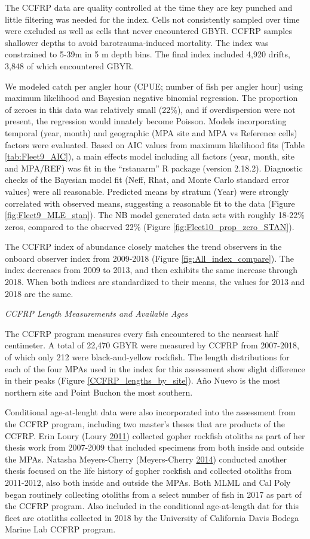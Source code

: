 \documentclass[12pt,]{article}
\begin{document}
The CCFRP data are quality controlled at the time they are key punched
and little filtering was needed for the index. Cells not consistently
sampled over time were excluded as well as cells that never encountered
GBYR. CCFRP samples shallower depths to avoid barotrauma-induced
mortality. The index was constrained to 5-39m in 5 m depth bins. The
final index included 4,920 drifts, 3,848 of which encountered GBYR.

We modeled catch per angler hour (CPUE; number of fish per angler hour)
using maximum likelihood and Bayesian negative binomial regression. The
proportion of zeroes in this data was relatively small (22\%), and if
overdispersion were not present, the regression would innately become
Poisson. Models incorporating temporal (year, month) and geographic (MPA
site and MPA vs Reference cells) factors were evaluated. Based on AIC
values from maximum likelihood fits (Table \ref{tab:Fleet9_AIC}), a main
effects model including all factors (year, month, site and MPA/REF) was
fit in the ``rstanarm'' R package (version 2.18.2). Diagnostic checks of
the Bayesian model fit (Neff, Rhat, and Monte Carlo standard error
values) were all reasonable. Predicted means by stratum (Year) were
strongly correlated with observed means, suggesting a reasonable fit to
the data (Figure \ref{fig:Fleet9_MLE_stan}). The NB model generated data
sets with roughly 18-22\% zeros, compared to the observed 22\% (Figure
\ref{fig:Fleet10_prop_zero_STAN}).

The CCFRP index of abundance closely matches the trend observers in the
onboard observer index from 2009-2018 (Figure
\ref{fig:All_index_compare}). The index decreases from 2009 to 2013, and
then exhibits the same increase through 2018. When both indices are
standardized to their means, the values for 2013 and 2018 are the same.

\emph{CCFRP Length Measurements and Available Ages}

The CCFRP program measures every fish encountered to the nearsest half
centimeter. A total of 22,470 GBYR were measured by CCFRP from
2007-2018, of which only 212 were black-and-yellow rockfish. The length
distributions for each of the four MPAs used in the index for this
assessment show slight difference in their peaks (Figure
\ref{CCFRP_lengths_by_site}). Año Nuevo is the most northern site and
Point Buchon the most southern.

Conditional age-at-lenght data were also incorporated into the
assessment from the CCFRP program, including two master's theses that
are products of the CCFRP. Erin Loury (Loury
\protect\hyperlink{ref-Loury2011}{2011}) collected gopher rockfish
otoliths as part of her thesis work from 2007-2009 that included
specimens from both inside and outside the MPAs. Natasha Meyers-Cherry
(Meyers-Cherry \protect\hyperlink{ref-MeyersCherry2014}{2014}) conducted
another thesis focused on the life history of gopher rockfish and
collected otoliths from 2011-2012, also both inside and outside the
MPAs. Both MLML and Cal Poly began routinely collecting otoliths from a
select number of fish in 2017 as part of the CCFRP program. Also
included in the conditional age-at-length dat for this fleet are
ototliths collected in 2018 by the University of California Davis Bodega
Marine Lab CCFRP program.
\end{document}
